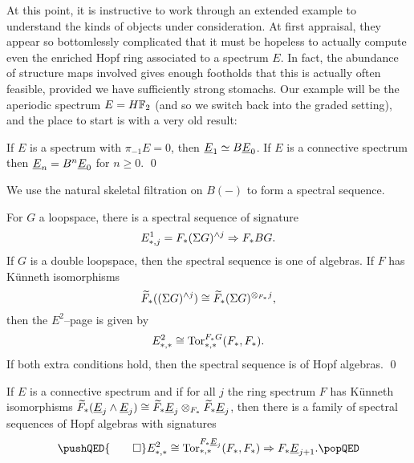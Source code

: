 At this point, it is instructive to work through an extended example to understand the kinds of objects under consideration.  At first appraisal, they appear so bottomlessly complicated that it must be hopeless to actually compute even the enriched Hopf ring associated to a spectrum \(E\).  In fact, the abundance of structure maps involved gives enough footholds that this is actually often feasible, provided we have sufficiently strong stomachs.  Our example will be the aperiodic spectrum \(E = \HFtwo\) (and so we switch back into the graded setting), and the place to start is with a very old result:
\begin{lemma}
If \(E\) is a spectrum with \(\pi_{-1} E = 0\), then \(\OS{E}{1} \simeq B\OS{E}{0}\).  If \(E\) is a connective spectrum then \(\OS{E}{n} = B^n \OS{E}{0}\) for \(n \ge 0\). \qed
\end{lemma}
\noindent We use the natural skeletal filtration on \(B(-)\) to form a spectral sequence.
\begin{lemma}
For \(G\) a loopspace, there is a spectral sequence of signature \[E^1_{*, j} = F_*(\Sigma G)^{\wedge j} \Rightarrow F_* BG.\]  If \(G\) is a double loopspace, then the spectral sequence is one of algebras.  If \(F\) has K\"unneth isomorphisms \[\widetilde F_*((\Sigma G)^{\wedge j}) \cong \widetilde F_*(\Sigma G)^{\otimes_{F_*} j},\] then the \(E^2\)--page is given by \[E^2_{*, *} \cong \operatorname{Tor}^{F_* G}_{*, *}(F_*, F_*).\]  If both extra conditions hold, then the spectral sequence is of Hopf algebras. \qed
\end{lemma}
\begin{corollary}
If \(E\) is a connective spectrum and if for all \(j\) the ring spectrum \(F\) has K\"unneth isomorphisms \(\widetilde F_*(\OS{E}{j} \sm \OS{E}{j}) \cong \widetilde F_* \OS{E}{j} \otimes_{F_*} \widetilde F_* \OS{E}{j}\), then there is a family of spectral sequences of Hopf algebras with signatures
\[
\pushQED{\qed}
E^2_{*, *} \cong \Tor^{F_* \OS{E}{j}}_{*, *}(F_*, F_*) \Rightarrow F_* \OS{E}{j+1}. \qedhere
\popQED
\]
\end{corollary}

